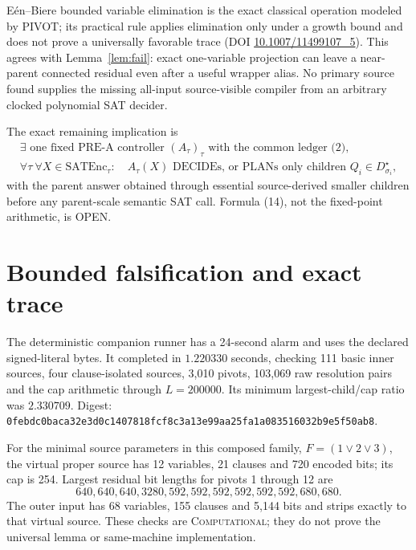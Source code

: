 \documentclass[11pt]{article}
\begin{document}
E\'en--Biere bounded variable elimination is the exact classical operation
modeled by PIVOT; its practical rule applies elimination only under a growth
bound and does not prove a universally favorable trace
(DOI \href{https://doi.org/10.1007/11499107_5}{10.1007/11499107\_5}).
This agrees with Lemma~\ref{lem:fail}: exact one-variable projection can
leave a near-parent connected residual even after a useful wrapper alias.
No primary source found supplies the missing all-input source-visible
compiler from an arbitrary clocked polynomial SAT decider.

The exact remaining implication is
\[
\boxed{\begin{gathered}
 \exists\text{ one fixed PRE-A controller }(A_\tau)_\tau\text{ with the
 common ledger (2)},\\
 \forall\tau\ \forall X\in\mathrm{SATEnc}_\tau:\quad
 A_\tau(X)\text{ DECIDEs, or PLANs only children }Q_i\in D_{\sigma_i}^\star,
\end{gathered}}                                                     \tag{14}
\]
with the parent answer obtained through essential source-derived smaller
children before any parent-scale semantic SAT call.  Formula (14), not the
fixed-point arithmetic, is OPEN.

\section{Bounded falsification and exact trace}
The deterministic companion runner has a 24-second alarm and uses the
declared signed-literal bytes.  It completed in $1.220330$ seconds, checking
111 basic inner sources, four clause-isolated sources, 3,010 pivots, 103,069
raw resolution pairs and the cap
arithmetic through $L=200000$.  Its minimum largest-child/cap ratio was
$2.330709$.  Digest:
\texttt{0febdc0baca32e3d0c1407818fcf8c3a13e99aa25fa1a083516032b9e5f50ab8}.

For the minimal source parameters in this composed family,
$F=(1\vee2\vee3)$, the virtual proper source has 12 variables, 21 clauses and
720 encoded bits; its cap is 254.  Largest residual bit lengths for pivots
1 through 12 are
\[
640,640,640,3280,592,592,592,592,592,592,680,680.
\]
The outer input has 68 variables, 155 clauses and 5,144 bits and strips
exactly to that virtual source.  These checks are \textsc{Computational};
they do not prove the universal lemma or same-machine implementation.
\end{document}
